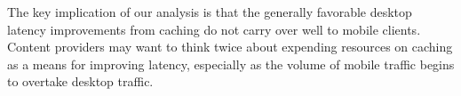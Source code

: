 The key implication of our analysis is that the generally favorable desktop latency improvements from caching do not carry over well to mobile clients. 
Content providers may want to think twice about expending resources on caching as a means for improving latency, especially as the volume of mobile traffic begins to overtake desktop traffic.

